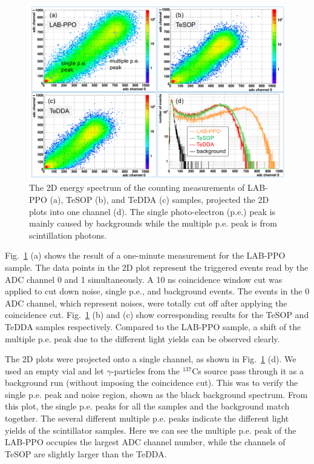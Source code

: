 \begin{figure}[htbp]
	\centering	
	\includegraphics[width=14cm]{TeLS_2Denergy.png}
	\caption[The 2D energy spectrum of the counting measurements.]{The 2D energy spectrum of the counting measurements of LAB-PPO (a), TeSOP (b), and TeDDA (c) samples, projected the 2D plots into one channel (d). The single photo-electron (p.e.) peak is mainly caused by backgrounds while the multiple p.e. peak is from scintillation photons.}
	\label{teLSresults}
\end{figure}

Fig.~\ref{teLSresults} (a) shows the result of a one-minute measurement for the LAB-PPO sample. The data points in the 2D plot represent the triggered events read by the ADC channel 0 and 1 simultaneously. A 10 ns coincidence window cut was applied to cut down noise, single p.e., and background events. The events in the 0 ADC channel, which represent noises, were totally cut off after applying the coincidence cut. Fig.~\ref{teLSresults} (b) and (c) show corresponding results for the TeSOP and TeDDA samples respectively. Compared to the LAB-PPO sample, a shift of the multiple p.e. peak due to the different light yields can be observed clearly. %

The 2D plots were projected onto a single channel, as shown in Fig.~\ref{teLSresults} (d). We used an empty vial and let $\gamma$-particles from the $^{137}$Cs source pass through it as a background run (without imposing the coincidence cut). This was to verify the single p.e. peak and noise region, shown as the black background spectrum. From this plot, the single p.e. peaks for all the samples and the background match together. The several different multiple p.e. peaks indicate the different light yields of the scintillator samples. Here we can see the multiple p.e. peak of the LAB-PPO occupies the largest ADC channel number, while the channels of TeSOP are slightly larger than the TeDDA. 

